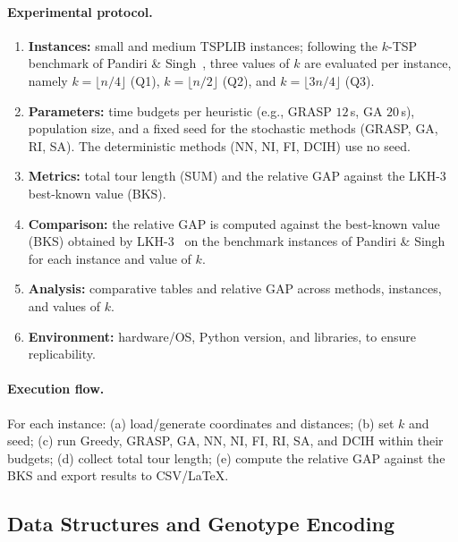 \documentclass[conference]{IEEEtran}
\begin{document}
\paragraph{Experimental protocol.}
\begin{enumerate}[label=\roman*)]
  \item \textbf{Instances:} small and medium TSPLIB instances; following the $k$-TSP benchmark of Pandiri \& Singh~\cite{pandiri2020}, three values of $k$ are evaluated per instance, namely $k=\lfloor n/4\rfloor$ (Q1), $k=\lfloor n/2\rfloor$ (Q2), and $k=\lfloor 3n/4\rfloor$ (Q3).
  \item \textbf{Parameters:} time budgets per heuristic (e.g., GRASP $12$\,s, GA $20$\,s), population size, and a fixed seed for the stochastic methods (GRASP, GA, RI, SA). The deterministic methods (NN, NI, FI, DCIH) use no seed.
  \item \textbf{Metrics:} total tour length (SUM) and the relative GAP against the LKH-3 best-known value (BKS).
  \item \textbf{Comparison:} the relative GAP is computed against the best-known value (BKS) obtained by LKH-3~\cite{Helsgaun} on the benchmark instances of Pandiri \& Singh~\cite{pandiri2020} for each instance and value of $k$.
  \item \textbf{Analysis:} comparative tables and relative GAP across methods, instances, and values of $k$.
  \item \textbf{Environment:} hardware/OS, Python version, and libraries, to ensure replicability.
\end{enumerate}

\paragraph{Execution flow.}
For each instance: (a) load/generate coordinates and distances; (b) set $k$ and seed;
(c) run Greedy, GRASP, GA, NN, NI, FI, RI, SA, and DCIH within their budgets; (d) collect total tour length;
(e) compute the relative GAP against the BKS and export results to CSV/LaTeX.

\begingroup
{}
\setlength{\abovedisplayskip}{6pt}
\setlength{\belowdisplayskip}{6pt}

\subsection{Data Structures and Genotype Encoding}
\end{document}
